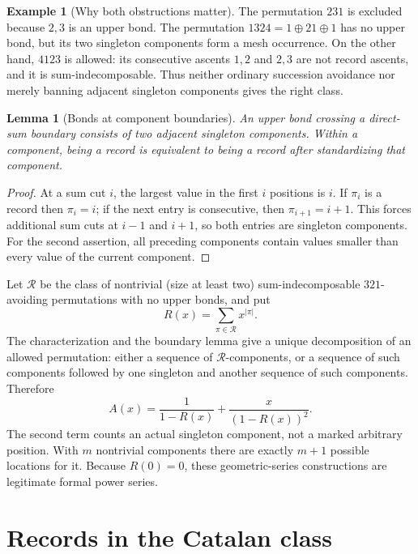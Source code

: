\documentclass[11pt,a4paper]{article}
\newtheorem{lemma}[theorem]{Lemma}
\theoremstyle{definition}
\newtheorem{example}[theorem]{Example}
\theoremstyle{remark}
\newcommand{\core}{\mathcal{R}}
\begin{document}
\begin{example}[Why both obstructions matter]
The permutation $231$ is excluded because $2,3$ is an upper bond.
The permutation $1324=1\oplus21\oplus1$ has no upper bond, but its two
singleton components form a mesh occurrence. On the other hand, $4123$
is allowed: its consecutive ascents $1,2$ and $2,3$ are not record ascents,
and it is sum-indecomposable. Thus neither ordinary succession avoidance
nor merely banning adjacent singleton components gives the right class.
\end{example}

\begin{lemma}[Bonds at component boundaries]\label{lem:boundary}
An upper bond crossing a direct-sum boundary consists of two adjacent
singleton components. Within a component, being a record is equivalent
to being a record after standardizing that component.
\end{lemma}
\begin{proof}
At a sum cut $i$, the largest value in the first $i$ positions is $i$.
If $\pi_i$ is a record then $\pi_i=i$; if the next entry is consecutive,
then $\pi_{i+1}=i+1$. This forces additional sum cuts at $i-1$ and $i+1$,
so both entries are singleton components. For the second assertion,
all preceding components contain values smaller than every value of the
current component.
\end{proof}

Let $\core$ be the class of nontrivial (size at least two)
sum-indecomposable $321$-avoiding permutations with no upper bonds, and put
\begin{equation}\label{eq:Rdef}
 R(x)=\sum_{\pi\in\core}x^{|\pi|}.
\end{equation}
The characterization and the boundary lemma give a unique decomposition of
an allowed permutation: either a sequence of $\core$-components, or a
sequence of such components followed by one singleton and another sequence
of such components. Therefore
\begin{equation}\label{eq:assembly}
 \boxed{\displaystyle A(x)=\frac{1}{1-R(x)}+
                          \frac{x}{(1-R(x))^2}.}
\end{equation}
The second term counts an actual singleton component, not a marked arbitrary
position. With $m$ nontrivial components there are exactly $m+1$ possible
locations for it. Because $R(0)=0$, these geometric-series constructions
are legitimate formal power series.

\section{Records in the Catalan class}
\end{document}
